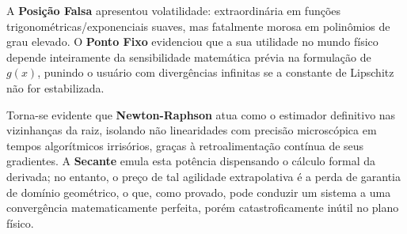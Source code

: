 A \textbf{Posição Falsa} apresentou volatilidade: extraordinária em funções trigonométricas/exponenciais suaves, mas fatalmente morosa em polinômios de grau elevado. O \textbf{Ponto Fixo} evidenciou que a sua utilidade no mundo físico depende inteiramente da sensibilidade matemática prévia na formulação de $g(x)$, punindo o usuário com divergências infinitas se a constante de Lipschitz não for estabilizada.

Torna-se evidente que \textbf{Newton-Raphson} atua como o estimador definitivo nas vizinhanças da raiz, isolando não linearidades com precisão microscópica em tempos algorítmicos irrisórios, graças à retroalimentação contínua de seus gradientes. A \textbf{Secante} emula esta potência dispensando o cálculo formal da derivada; no entanto, o preço de tal agilidade extrapolativa é a perda de garantia de domínio geométrico, o que, como provado, pode conduzir um sistema a uma convergência matematicamente perfeita, porém catastroficamente inútil no plano físico.